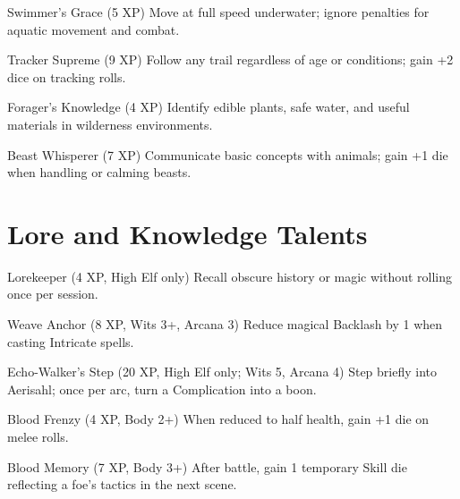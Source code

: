 \documentclass[11pt]{article}
\begin{document}
\begin{talentbox}{Swimmer's Grace (5 XP)}
Move at full speed underwater; ignore penalties for aquatic movement and combat.
\end{talentbox}

\begin{talentbox}{Tracker Supreme (9 XP)}
Follow any trail regardless of age or conditions; gain +2 dice on tracking rolls.
\end{talentbox}

\begin{talentbox}{Forager's Knowledge (4 XP)}
Identify edible plants, safe water, and useful materials in wilderness environments.
\end{talentbox}

\begin{talentbox}{Beast Whisperer (7 XP)}
Communicate basic concepts with animals; gain +1 die when handling or calming beasts.
\end{talentbox}

\section*{Lore and Knowledge Talents}

\begin{talentbox}{Lorekeeper (4 XP, High Elf only)}
Recall obscure history or magic without rolling once per session.
\end{talentbox}

\begin{talentbox}{Weave Anchor (8 XP, Wits 3+, Arcana 3)}
Reduce magical Backlash by 1 when casting Intricate spells.
\end{talentbox}

\begin{talentbox}{Echo-Walker's Step (20 XP, High Elf only; Wits 5, Arcana 4)}
Step briefly into Aerisahl; once per arc, turn a Complication into a boon.
\end{talentbox}

\begin{talentbox}{Blood Frenzy (4 XP, Body 2+)}
When reduced to half health, gain +1 die on melee rolls.
\end{talentbox}

\begin{talentbox}{Blood Memory (7 XP, Body 3+)}
After battle, gain 1 temporary Skill die reflecting a foe's tactics in the next scene.
\end{talentbox}
\end{document}
